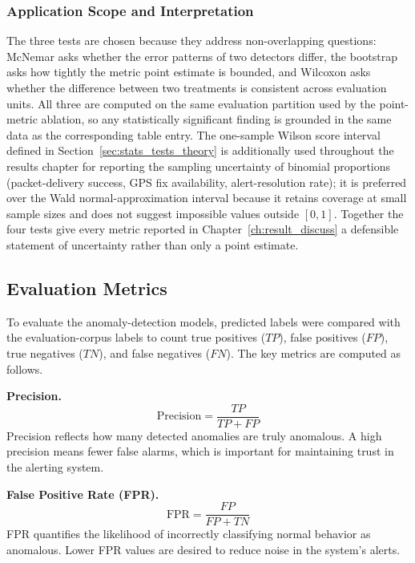 \subsubsection{Application Scope and Interpretation}
\label{sec:proto_application}

The three tests are chosen because they address non-overlapping questions: McNemar asks whether the error patterns of two detectors differ, the bootstrap asks how tightly the metric point estimate is bounded, and Wilcoxon asks whether the difference between two treatments is consistent across evaluation units. All three are computed on the same evaluation partition used by the point-metric ablation, so any statistically significant finding is grounded in the same data as the corresponding table entry. The one-sample Wilson score interval~\cite{wilson1927probable} defined in Section~\ref{sec:stats_tests_theory} is additionally used throughout the results chapter for reporting the sampling uncertainty of binomial proportions (packet-delivery success, GPS fix availability, alert-resolution rate); it is preferred over the Wald normal-approximation interval because it retains coverage at small sample sizes and does not suggest impossible values outside $[0, 1]$. Together the four tests give every metric reported in Chapter~\ref{ch:result_discuss} a defensible statement of uncertainty rather than only a point estimate.

\subsection{Evaluation Metrics}
\label{sec:evaluate}

To evaluate the anomaly-detection models, predicted labels were compared with the evaluation-corpus labels to count true positives ($TP$), false positives ($FP$), true negatives ($TN$), and false negatives ($FN$). The key metrics are computed as follows.

\textbf{Precision.}
\begin{equation}
\mathrm{Precision} = \frac{TP}{TP + FP}
\label{eq:precision}
\end{equation}
Precision reflects how many detected anomalies are truly anomalous. A high precision means fewer false alarms, which is important for maintaining trust in the alerting system.

\textbf{False Positive Rate (FPR).}
\begin{equation}
\mathrm{FPR} = \frac{FP}{FP + TN}
\label{eq:fpr}
\end{equation}
FPR quantifies the likelihood of incorrectly classifying normal behavior as anomalous. Lower FPR values are desired to reduce noise in the system's alerts.

